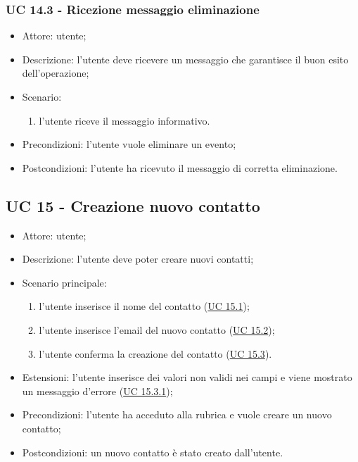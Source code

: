 \subsubsection{UC 14.3 - Ricezione messaggio eliminazione} \label{sec: UC 14.3}
\begin{itemize}
    \item Attore: utente;
    \item Descrizione: l'utente deve ricevere un messaggio che garantisce il buon esito dell'operazione;
    \item Scenario:
        \begin{enumerate}
        \item l'utente riceve il messaggio informativo.
        \end{enumerate}
    
    \item Precondizioni: l'utente vuole eliminare un evento;
    \item Postcondizioni: l'utente ha ricevuto il messaggio di corretta eliminazione.
\end{itemize}




\subsection{UC 15 - Creazione nuovo contatto}
\begin{itemize}
    \item Attore: utente;
    \item Descrizione: l'utente deve poter creare nuovi contatti;
    \item Scenario principale:
        \begin{enumerate}
        \item l'utente inserisce il nome del contatto (\hyperref[sec: UC 15.1]{UC 15.1});
        \item l'utente inserisce l'email del nuovo contatto (\hyperref[sec: UC 15.2]{UC 15.2});
        \item l'utente conferma la creazione del contatto (\hyperref[sec: UC 15.3]{UC 15.3}).
        \end{enumerate}
    \item Estensioni: l'utente inserisce dei valori non validi nei campi e viene mostrato un messaggio d'errore (\hyperref[sec: UC 15.3.1]{UC 15.3.1});
    \item Precondizioni: l'utente ha acceduto alla rubrica e vuole creare un nuovo contatto;
    \item Postcondizioni: un nuovo contatto è stato creato dall'utente.
\end{itemize}


